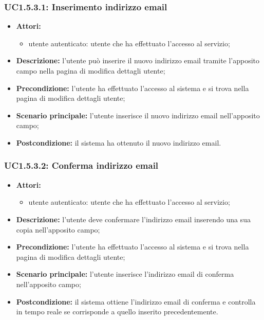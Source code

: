 \subsubsection{UC1.5.3.1: Inserimento indirizzo email}
\begin{itemize}
	\item \textbf{Attori:}
	\begin{itemize}
		\item utente autenticato: utente che ha effettuato l'accesso al servizio;
	\end{itemize}
	\item \textbf{Descrizione:} l'utente può inserire il nuovo indirizzo email tramite l'apposito campo nella pagina di modifica dettagli utente;
	\item \textbf{Precondizione:} l'utente ha effettuato l'accesso al sistema e si trova nella pagina di modifica dettagli utente;
	\item \textbf{Scenario principale:} l'utente inserisce il nuovo indirizzo email nell'apposito campo;
	\item \textbf{Postcondizione:} il sistema ha ottenuto il nuovo indirizzo email.
\end{itemize}

\subsubsection{UC1.5.3.2: Conferma indirizzo email}
\begin{itemize}
	\item \textbf{Attori:}
	\begin{itemize}
		\item utente autenticato: utente che ha effettuato l'accesso al servizio;
	\end{itemize}
	\item \textbf{Descrizione:} l'utente deve confermare l'indirizzo email inserendo una sua copia nell'apposito campo;
	\item \textbf{Precondizione:} l'utente ha effettuato l'accesso al sistema e si trova nella pagina di modifica dettagli utente;
	\item \textbf{Scenario principale:} l'utente inserisce l'indirizzo email di conferma nell'apposito campo;
	\item \textbf{Postcondizione:} il sistema ottiene l'indirizzo email di conferma e controlla in tempo reale se corrisponde a quello inserito precedentemente.
\end{itemize}

